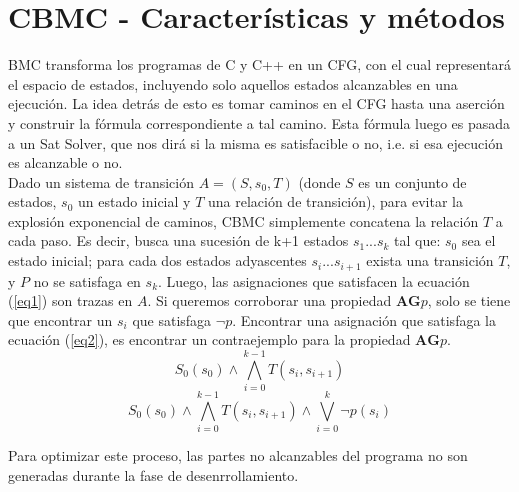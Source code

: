 \documentclass{llncs}
\begin{document}
\section{CBMC - Características y métodos}
    BMC transforma los programas de C y C++ en un CFG, con el cual representará
    el espacio de estados, incluyendo solo aquellos estados alcanzables en una
    ejecución. 
    La idea detrás de esto es tomar caminos en el CFG hasta una aserción y
    construir la fórmula correspondiente a tal camino. Esta fórmula luego es
    pasada a un Sat Solver, que nos dirá si la misma es satisfacible o no, i.e.
    si esa ejecución es alcanzable o no.\\
    \indent Dado un sistema de transición $A=(S,s_{0},T)$ (donde $S$ es un
    conjunto de estados, $s_{0}$ un estado inicial y $T$ una relación de
    transición), para evitar la explosión  exponencial de caminos, CBMC
    simplemente concatena la relación $T$ a cada paso. Es decir, busca una
    sucesión de k+1 estados $s_{1}...s_{k}$ tal que: $s_{0}$ sea el estado
    inicial; para cada dos estados adyascentes $s_{i}...s_{i+1}$ exista una
    transición $T$, y $P$ no se satisfaga en $s_{k}$. Luego, las asignaciones
    que satisfacen la ecuación (\ref{eq1}) son trazas en $A$. Si queremos
    corroborar una propiedad $\textbf{AG}p$, solo se tiene que encontrar un
    $s_{i}$ que satisfaga $\neg p$. Encontrar una asignación que satisfaga la
    ecuación (\ref{eq2}), es encontrar un contraejemplo para la propiedad
    $\textbf{AG}p$.\\

    \begin{equation}
        S_{0}(s_{0}) \wedge \bigwedge_{i=0}^{k-1} T(s_{i},s_{i+1})
        \label{eq1}
    \end{equation}
    \begin{equation}
        S_{0}(s_{0}) \wedge \bigwedge_{i=0}^{k-1} T(s_{i},s_{i+1}) \wedge
        \bigvee_{i=0}^{k} \neg p(s_{i})
        \label{eq2}
    \end{equation}

    \indent Para optimizar este proceso, las partes no alcanzables del
    programa no son generadas durante la fase de desenrrollamiento.
\end{document}
